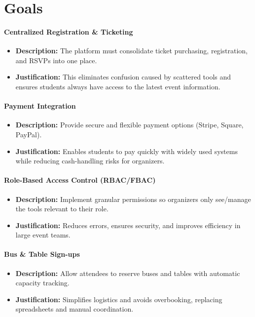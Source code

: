 \documentclass{article}
\begin{document}
\section{Goals}


\paragraph{Centralized Registration \& Ticketing}
\begin{itemize}
    \item \textbf{Description:} The platform must consolidate ticket purchasing, registration, and RSVPs into one place.
    \item \textbf{Justification:} This eliminates confusion caused by scattered tools and ensures students always have access to the latest event information.
\end{itemize}

\paragraph{Payment Integration}
\begin{itemize}
    \item \textbf{Description:} Provide secure and flexible payment options (Stripe, Square, PayPal).
    \item \textbf{Justification:} Enables students to pay quickly with widely used systems while reducing cash-handling risks for organizers.
\end{itemize}

\paragraph{Role-Based Access Control (RBAC/FBAC)}
\begin{itemize}
    \item \textbf{Description:} Implement granular permissions so organizers only see\slash manage the tools relevant to their role.
    \item \textbf{Justification:} Reduces errors, ensures security, and improves efficiency in large event teams.
\end{itemize}

\paragraph{Bus \& Table Sign-ups}
\begin{itemize}
    \item \textbf{Description:} Allow attendees to reserve buses and tables with automatic capacity tracking.
    \item \textbf{Justification:} Simplifies logistics and avoids overbooking, replacing spreadsheets and manual coordination.
\end{itemize}
\end{document}
